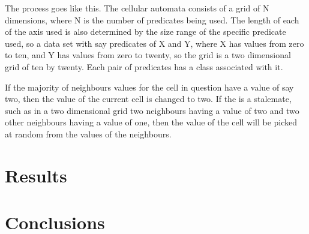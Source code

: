 \documentclass[11pt]{article}
\begin{document}
  The process goes like this.  The cellular automata consists of a
  grid of N dimensions, where N is the number of predicates being
  used.  The length of each of the axis used is also determined by the
  size range of the specific predicate used, so a data set with say
  predicates of X and Y, where X has values from zero to ten, and Y
  has values from zero to twenty, so the grid is a two dimensional
  grid of ten by twenty.  Each pair of predicates has a class
  associated with it.  

  If the majority of neighbours values for the
  cell in question have a value of say two, then the value of the
  current cell is changed to two.  If the is a stalemate, such as in a
  two dimensional grid two neighbours having a value of two and two
  other neighbours having a value of one, then the value of the cell
  will be picked at random from the values of the neighbours.
\section{Results}
\label{sec-4}

  
\section{Conclusions}
\label{sec-5}

  




\end{document}
